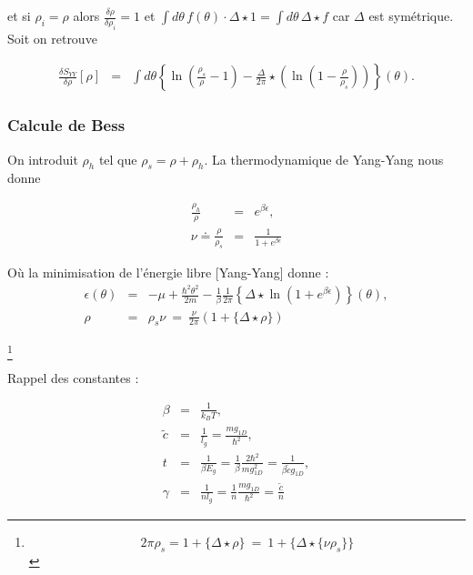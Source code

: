 	et si $\rho_i = \rho$ alors $\frac{\delta \rho }{ \delta \rho_i } = 1 $ et $\int d \theta \, f (\theta ) \cdot \Delta \star 1 = \int d \theta \,  \Delta \star f $ car $\Delta$ est symétrique. 	Soit on retrouve 

	
	\begin{eqnarray}
		\frac{ \delta S_{YY} }{ \delta \rho } [\rho ]  & = & \int d \theta \left \{ \ln \left ( \frac{ \rho_s}{ \rho} - 1 \right ) - \frac{ \Delta}{2 \pi} \star \left ( \ln \left ( 1 - \frac{ \rho}{ \rho_s}\right ) \right ) \right \} ( \theta )	.	
	\end{eqnarray}



%

	
	
\subsubsection{Calcule de Bess}

On introduit $\rho_h$ tel que $\rho_s = \rho + \rho_h$. La thermodynamique de Yang-Yang nous donne 

\begin{eqnarray}
	\frac{\rho_h}{\rho} & = & e^{\beta \epsilon }, \\
	\nu \doteq \frac{\rho}{\rho_s} & = & \frac{1}{1+ e ^{\beta \epsilon} }	
\end{eqnarray}

Où la minimisation de l'énergie libre [Yang-Yang] donne :
\begin{eqnarray}
	\epsilon ( \theta ) & = & - \mu + \frac{\hbar^2 \theta^2 }{2 m} - \frac{1}{ \beta } \frac{1}{2 \pi} \left \{\Delta \star \ln \left ( 1 + e^{\beta \epsilon} \right )  \right \} ( \theta ), \\
	\rho &=&  \rho_s \nu   ~=~   \frac{\nu}{2 \pi } ( 1 + \{ \Delta \star \rho \} ) 	
\end{eqnarray}

\footnote{$$ 	2\pi \rho_s  =  1 + \{ \Delta \star \rho \} ~= ~ 1 + \{ \Delta \star \{\nu \rho_s\} \} $$}

Rappel des constantes :

\begin{eqnarray*}
	\beta & = & \frac{1}{ k_B T} ,\\
	\tilde{c} & =& \frac{1}{l_g}  = \frac{ m g_{1D}}{\hbar^2},\\
	t & = & \frac{1}{\beta E_g} = \frac{1}{ \beta} \frac{2 \hbar^2 }	{ m g_{1D}^2 } = \frac{1}{ \beta  \tilde{c} g_{1D} },\\
	\gamma & = & \frac{1}{n l_g } = \frac{1}{n} \frac{ m g_{1D}}{\hbar^2} = \frac{\tilde{c}}{n} 
\end{eqnarray*}

